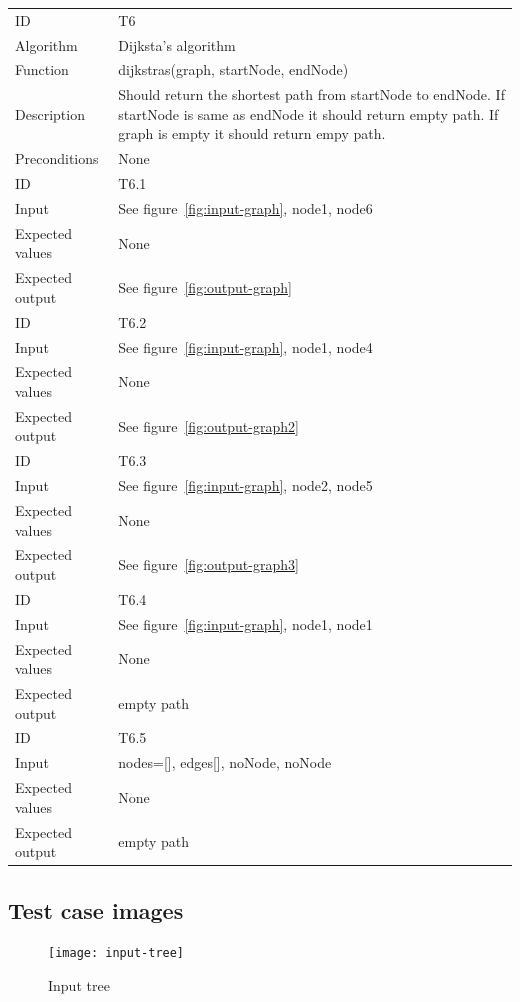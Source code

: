 \documentclass {article}
\begin{document}
\begin{tabular}{ | l p{10cm} | }
\hline
ID & T6 \\
Algorithm & Dijksta's algorithm \\
Function & dijkstras(graph, startNode, endNode) \\
Description & Should return the shortest path from startNode to endNode. If startNode is same as endNode it should return empty path. If graph is empty it should return empy path.\\
Preconditions & None \\
\hline
ID & T6.1 \\
Input & See figure~\ref{fig:input-graph}, node1, node6 \\
Expected values & None \\
Expected output &  See figure~\ref{fig:output-graph} \\
\hline
ID & T6.2 \\
Input & See figure~\ref{fig:input-graph}, node1, node4 \\
Expected values & None \\
Expected output &  See figure~\ref{fig:output-graph2} \\
\hline
ID & T6.3 \\
Input & See figure~\ref{fig:input-graph}, node2, node5 \\
Expected values & None \\
Expected output &  See figure~\ref{fig:output-graph3} \\
\hline
ID & T6.4 \\
Input & See figure~\ref{fig:input-graph}, node1, node1\\
Expected values & None \\
Expected output & empty path \\
\hline
ID & T6.5 \\
Input & nodes=[], edges[], noNode, noNode \\
Expected values & None \\
Expected output & empty path \\
\hline
\end{tabular}
\subsection{Test case images}
\begin{figure}[H]
\texttt{[image: input-tree]}

\caption{Input tree}
\label{fig:input-tree}
\end{figure}
\end{document}
